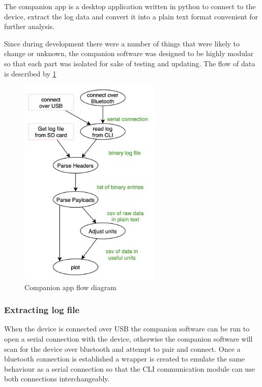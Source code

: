 The companion app is a desktop application written in python to connect to the device, extract the log data and convert it into a plain text format convenient for further analysis.

Since during development there were a number of things that were likely to change or unknown, the companion software was designed to be highly modular so that each part was isolated for sake of testing and updating.  The flow of data is described by \ref{fig:companion_app}

\begin{figure}[!htb]
    \centering
    \includegraphics[width=0.6\textwidth]{images/companion_app_flow.png}
    \caption{Companion app flow diagram}
    \label{fig:companion_app}
\end{figure}
    

\subsubsection{Extracting log file}

When the device is connected over USB the companion software can be run to open a serial connection with the device, otherwise the companion software will scan for the device over bluetooth and attempt to pair and connect.  Once a bluetooth connection is established a wrapper is created to emulate the same behaviour as a serial connection so that the CLI communication module can use both connections interchangeably.


